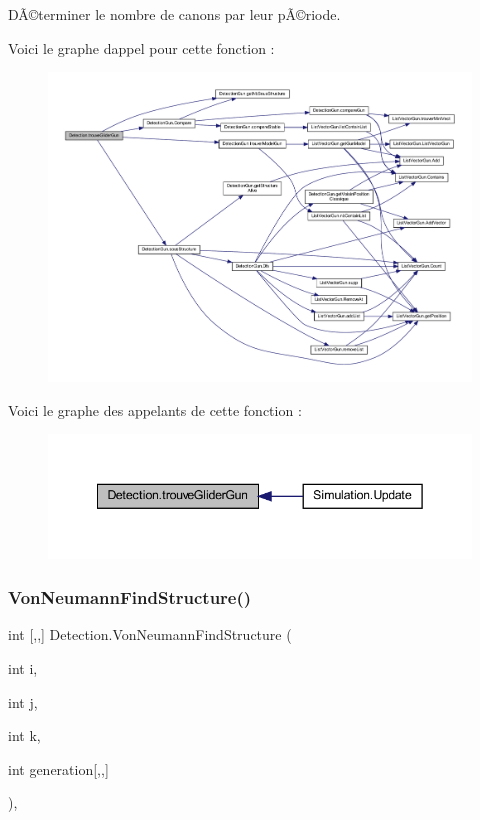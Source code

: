 DÃ©terminer le nombre de canons par leur pÃ©riode. 

Voici le graphe d\textquotesingle{}appel pour cette fonction \+:
\nopagebreak
\begin{figure}[H]
\begin{center}
\leavevmode
\includegraphics[width=350pt]{class_detection_aa21c434f39d4e9d901635d9db2a4bbca_cgraph}
\end{center}
\end{figure}
Voici le graphe des appelants de cette fonction \+:
\nopagebreak
\begin{figure}[H]
\begin{center}
\leavevmode
\includegraphics[width=342pt]{class_detection_aa21c434f39d4e9d901635d9db2a4bbca_icgraph}
\end{center}
\end{figure}
\mbox{\label{class_detection_a1909fbb1d96dbc6fed37fabc89444945}} 
\subsubsection{\texorpdfstring{Von\+Neumann\+Find\+Structure()}{VonNeumannFindStructure()}}
{\footnotesize\ttfamily int \mbox{[},,\mbox{]} Detection.\+Von\+Neumann\+Find\+Structure (\begin{DoxyParamCaption}\item[{int}]{i,  }\item[{int}]{j,  }\item[{int}]{k,  }\item[{int}]{generation\mbox{[},,\mbox{]} }\end{DoxyParamCaption})\hspace{0.3cm}{\ttfamily [inline]}, {\ttfamily [private]}}



